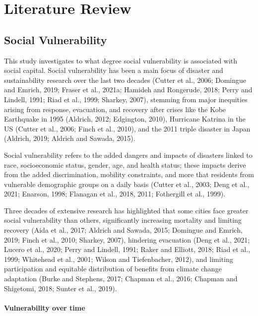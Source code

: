 \documentclass[]{elsarticle} %
\begin{document}
\hypertarget{literature-review}{%
\section{Literature Review}\label{literature-review}}

\hypertarget{social-vulnerability}{%
\subsection{Social Vulnerability}\label{social-vulnerability}}

This study investigates to what degree social vulnerability is
associated with social capital. Social vulnerability has been a main
focus of disaster and sustainability research over the last two decades
(Cutter et al., 2006; Domingue and Emrich, 2019; Fraser et al., 2021a;
Hamideh and Rongerude, 2018; Perry and Lindell, 1991; Riad et al., 1999;
Sharkey, 2007), stemming from major inequities arising from response,
evacuation, and recovery after crises like the Kobe Earthquake in 1995
(Aldrich, 2012; Edgington, 2010), Hurricane Katrina in the US (Cutter et
al., 2006; Finch et al., 2010), and the 2011 triple disaster in Japan
(Aldrich, 2019; Aldrich and Sawada, 2015).

Social vulnerability refers to the added dangers and impacts of
disasters linked to race, socioeconomic status, gender, age, and health
status; these impacts derive from the added discrimination, mobility
constraints, and more that residents from vulnerable demographic groups
on a daily basis (Cutter et al., 2003; Deng et al., 2021; Enarson, 1998;
Flanagan et al., 2018, 2011; Fothergill et al., 1999).

Three decades of extensive research has highlighted that some cities
face greater social vulnerability than others, significantly increasing
mortality and limiting recovery (Aida et al., 2017; Aldrich and Sawada,
2015; Domingue and Emrich, 2019; Finch et al., 2010; Sharkey, 2007),
hindering evacuation (Deng et al., 2021; Lucero et al., 2020; Perry and
Lindell, 1991; Raker and Elliott, 2018; Riad et al., 1999; Whitehead et
al., 2001; Wilson and Tiefenbacher, 2012), and limiting participation
and equitable distribution of benefits from climate change adaptation
(Burke and Stephens, 2017; Chapman et al., 2016; Chapman and Shigetomi,
2018; Sunter et al., 2019).

\hypertarget{vulnerability-over-time}{%
\paragraph{Vulnerability over time}\label{vulnerability-over-time}}
\end{document}
